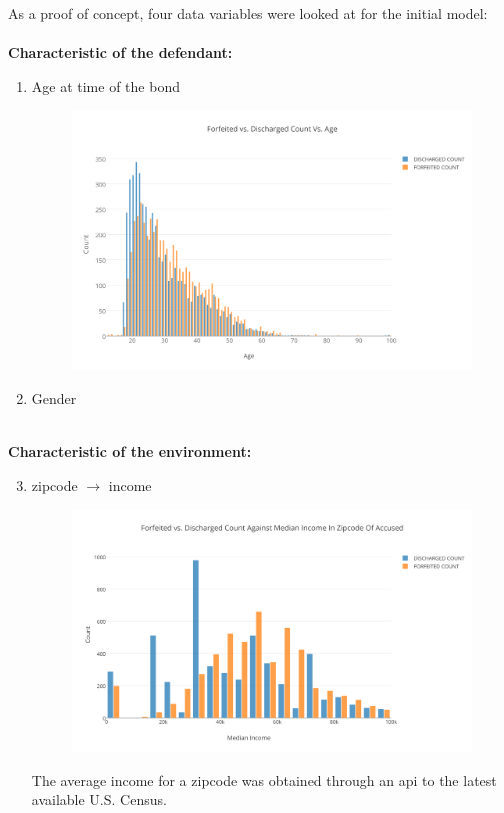 \documentclass{article}
\begin{document}
As a proof of concept, four data variables were looked at for the initial model: \\
~\\
\textbf{Characteristic of the defendant:}
~\\ 
\begin{enumerate}
\item Age at time of the bond
\begin{figure}[H]
\centering
\includegraphics[width=0.5\paperwidth]{Forfeited_vs_Discharged_Count_Vs_Age.png}
\end{figure}

\item Gender
\end{enumerate}
~\\
\textbf{Characteristic of the environment:}
~\\
\begin{enumerate}
\setcounter{enumi}{2}
\item zipcode $\rightarrow$ income
\begin{figure}[H]
\centering
\includegraphics[width=0.5\paperwidth]{Forfeited_vs_Discharged_Count_Against_Median_Income_In_Zipcode_Of_Accused.png}
\end{figure}

The average income for a zipcode was obtained through an api to the latest available U.S. Census.   
\end{enumerate}
\end{document}
